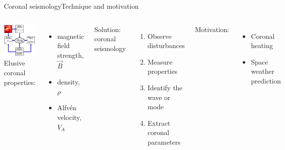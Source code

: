 \documentclass[table]{beamer}
\begin{document}
\begin{frame}{Coronal seismology}{Technique and motivation}
    \begin{columns}
        \includegraphics[width=\textwidth]{schematic.png}
            Elusive coronal properties:
            \begin{itemize}
                \item magnetic field strength, $\vec{B}$
                \item density, $\rho$
                \item Alfv\'en velocity, $V_A$
            \end{itemize}
            Solution: coronal seismology
            \begin{enumerate}
                \item Observe disturbances
                \item Measure properties
                \item Identify the wave or mode
                \item Extract coronal parameters
            \end{enumerate}
            Motivation:
            \begin{itemize}
                \item Coronal heating
                \item Space weather prediction
            \end{itemize}
    \end{columns}
\end{frame}%
\end{document}
